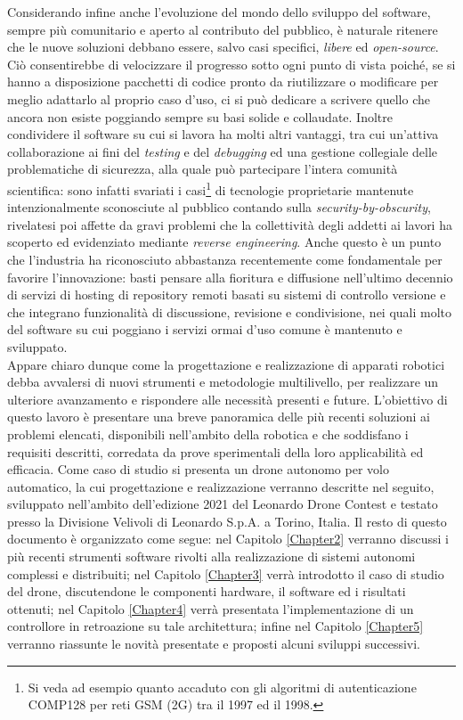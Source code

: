 Considerando infine anche l'evoluzione del mondo dello sviluppo del software, sempre più comunitario e aperto al contributo del pubblico, è naturale ritenere che le nuove soluzioni debbano essere, salvo casi specifici, \emph{libere} ed \emph{open-source}. Ciò consentirebbe di velocizzare il progresso sotto ogni punto di vista poiché, se si hanno a disposizione pacchetti di codice pronto da riutilizzare o modificare per meglio adattarlo al proprio caso d'uso, ci si può dedicare a scrivere quello che ancora non esiste poggiando sempre su basi solide e collaudate. Inoltre condividere il software su cui si lavora ha molti altri vantaggi, tra cui un'attiva collaborazione ai fini del \emph{testing} e del \emph{debugging} ed una gestione collegiale delle problematiche di sicurezza, alla quale può partecipare l'intera comunità scientifica: sono infatti svariati i casi\footnote{Si veda ad esempio quanto accaduto con gli algoritmi di autenticazione COMP128 per reti GSM (2G) tra il 1997 ed il 1998.} di tecnologie proprietarie mantenute intenzionalmente sconosciute al pubblico contando sulla \emph{security-by-obscurity}, rivelatesi poi affette da gravi problemi che la collettività degli addetti ai lavori ha scoperto ed evidenziato mediante \emph{reverse engineering}. Anche questo è un punto che l'industria ha riconosciuto abbastanza recentemente come fondamentale per favorire l'innovazione: basti pensare alla fioritura e diffusione nell'ultimo decennio di servizi di hosting di repository remoti basati su sistemi di controllo versione e che integrano funzionalità di discussione, revisione e condivisione, nei quali molto del software su cui poggiano i servizi ormai d'uso comune è mantenuto e sviluppato.\\
Appare chiaro dunque come la progettazione e realizzazione di apparati robotici debba avvalersi di nuovi strumenti e metodologie multilivello, per realizzare un ulteriore avanzamento e rispondere alle necessità presenti e future. L'obiettivo di questo lavoro è presentare una breve panoramica delle più recenti soluzioni ai problemi elencati, disponibili nell'ambito della robotica e che soddisfano i requisiti descritti, corredata da prove sperimentali della loro applicabilità ed efficacia. Come caso di studio si presenta un drone autonomo per volo automatico, la cui progettazione e realizzazione verranno descritte nel seguito, sviluppato nell'ambito dell'edizione 2021 del Leonardo Drone Contest e testato presso la Divisione Velivoli di Leonardo S.p.A. a Torino, Italia.\newpage
Il resto di questo documento è organizzato come segue: nel Capitolo \ref{Chapter2} verranno discussi i più recenti strumenti software rivolti alla realizzazione di sistemi autonomi complessi e distribuiti; nel Capitolo \ref{Chapter3} verrà introdotto il caso di studio del drone, discutendone le componenti hardware, il software ed i risultati ottenuti; nel Capitolo \ref{Chapter4} verrà presentata l'implementazione di un controllore in retroazione su tale architettura; infine nel Capitolo \ref{Chapter5} verranno riassunte le novità presentate e proposti alcuni sviluppi successivi.

